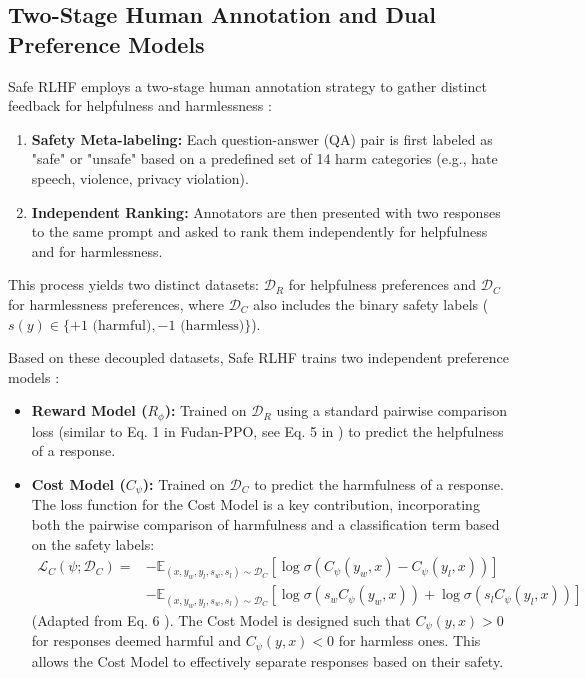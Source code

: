 \documentclass{article}
\begin{document}
\subsection{Two-Stage Human Annotation and Dual Preference Models}
Safe RLHF employs a two-stage human annotation strategy to gather distinct feedback for helpfulness and harmlessness \cite{Dai2023SafeRLHF}:
\begin{enumerate}
    \item \textbf{Safety Meta-labeling:} Each question-answer (QA) pair is first labeled as "safe" or "unsafe" based on a predefined set of 14 harm categories (e.g., hate speech, violence, privacy violation).
    \item \textbf{Independent Ranking:} Annotators are then presented with two responses to the same prompt and asked to rank them independently for helpfulness and for harmlessness.
\end{enumerate}
This process yields two distinct datasets: $\mathcal{D}_R$ for helpfulness preferences and $\mathcal{D}_C$ for harmlessness preferences, where $\mathcal{D}_C$ also includes the binary safety labels ($s(y) \in \{+1 \text{ (harmful)}, -1 \text{ (harmless)}\}$).

Based on these decoupled datasets, Safe RLHF trains two independent preference models \cite{Dai2023SafeRLHF}:
\begin{itemize}
    \item \textbf{Reward Model ($R_\phi$):} Trained on $\mathcal{D}_R$ using a standard pairwise comparison loss (similar to Eq. 1 in Fudan-PPO, see Eq. 5 in \cite{Dai2023SafeRLHF}) to predict the helpfulness of a response.
    \item \textbf{Cost Model ($C_\psi$):} Trained on $\mathcal{D}_C$ to predict the harmfulness of a response. The loss function for the Cost Model is a key contribution, incorporating both the pairwise comparison of harmfulness and a classification term based on the safety labels:
    \begin{equation}
        \begin{split}
        \label{eq:cost_model_loss}
    \mathcal{L}_{C}(\psi;\mathcal{D}_{C}) = &-\mathbb{E}_{(x,y_w,y_l,s_w,s_l)\sim\mathcal{D}_{C}}[\log\sigma(C_{\psi}(y_w,x)-C_{\psi}(y_l,x))] \\
                         &-\mathbb{E}_{(x,y_w,y_l,s_w,s_l)\sim\mathcal{D}_{C}}[\log\sigma(s_w C_{\psi}(y_w,x))
                         + \log\sigma(s_l C_{\psi}(y_l,x))]
    \end{split}
    \end{equation}
    (Adapted from Eq. 6 \cite{Dai2023SafeRLHF}). The Cost Model is designed such that $C_\psi(y,x) > 0$ for responses deemed harmful and $C_\psi(y,x) < 0$ for harmless ones. This allows the Cost Model to effectively separate responses based on their safety.
\end{itemize}
\end{document}
